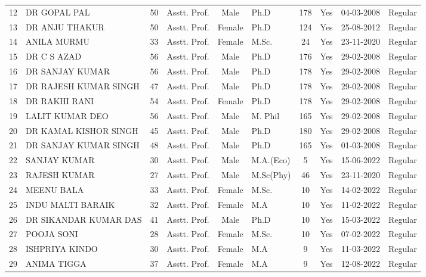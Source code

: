 \documentclass[a4paper]{article} %
\begin{document}
\begin{landscape}
\begin{table}[htbp]
\begin{tabular}{|c|l|c|l|c|l|c|c|c|l|}
12 & \MakeUppercase{DR GOPAL PAL} & 50 & Asstt. Prof. & Male & Ph.D & 178 & Yes & 04-03-2008 & Regular \\
13 & \MakeUppercase{DR ANJU THAKUR} & 50 & Asstt. Prof. & Female & Ph.D & 124 & Yes & 25-08-2012 & Regular \\
14 & \MakeUppercase{ANILA MURMU} & 33 & Asstt. Prof. & Female & M.Sc. & 24 & Yes & 23-11-2020 & Regular \\
15 & \MakeUppercase{DR C S AZAD} & 56 & Asstt. Prof. & Male & Ph.D & 176 & Yes & 29-02-2008 & Regular \\
16 & \MakeUppercase{DR SANJAY KUMAR} & 56 & Asstt. Prof. & Male & Ph.D & 178 & Yes & 29-02-2008 & Regular \\
17 & \MakeUppercase{DR RAJESH KUMAR SINGH} & 47 & Asstt. Prof. & Male & Ph.D & 178 & Yes & 29-02-2008 & Regular \\
18 & \MakeUppercase{DR RAKHI RANI} & 54 & Asstt. Prof. & Female & Ph.D & 178 & Yes & 29-02-2008 & Regular \\
19 & \MakeUppercase{LALIT KUMAR DEO} & 56 & Asstt. Prof. & Male & M. Phil & 165 & Yes & 29-02-2008 & Regular \\
20 & \MakeUppercase{DR KAMAL KISHOR SINGH} & 45 & Asstt. Prof. & Male & Ph.D & 180 & Yes & 29-02-2008 & Regular \\
21 & \MakeUppercase{DR SANJAY KUMAR SINGH} & 48 & Asstt. Prof. & Male & Ph.D & 165 & Yes & 01-03-2008 & Regular \\
22 & \MakeUppercase{SANJAY KUMAR} & 30 & Asstt. Prof. & Male & M.A.(Eco) & 5 & Yes & 15-06-2022 & Regular \\
23 & \MakeUppercase{RAJESH KUMAR} & 27 & Asstt. Prof. & Male & M.Sc(Phy) & 46 & Yes & 23-11-2020 & Regular \\
24 & \MakeUppercase{MEENU BALA} & 33 & Asstt. Prof. & Female & M.Sc. & 10 & Yes & 14-02-2022 & Regular \\
25 & \MakeUppercase{INDU MALTI BARAIK} & 32 & Asstt. Prof. & Female & M.A & 10 & Yes & 11-02-2022 & Regular \\
26 & \MakeUppercase{DR SIKANDAR KUMAR DAS} & 41 & Asstt. Prof. & Male & Ph.D & 10 & Yes & 15-03-2022 & Regular \\
27 & \MakeUppercase{POOJA SONI} & 28 & Asstt. Prof. & Female & M.Sc. & 10 & Yes & 07-02-2022 & Regular \\
28 & \MakeUppercase{ISHPRIYA KINDO} & 30 & Asstt. Prof. & Female & M.A & 9 & Yes & 11-03-2022 & Regular \\
29 & \MakeUppercase{ANIMA TIGGA} & 37 & Asstt. Prof. & Female & M.A & 9 & Yes & 12-08-2022 & Regular \\

\end{tabular}
\end{table}
\end{landscape}
\end{document}

